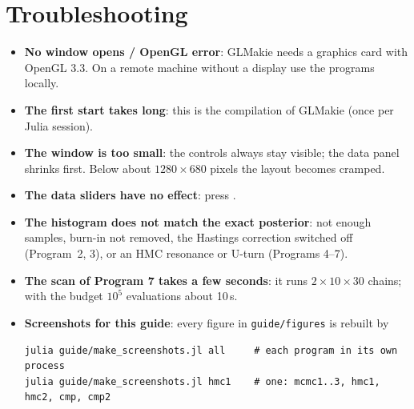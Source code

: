 \documentclass[11pt,a4paper]{article}
\newcommand{\btn}[1]{\fbox{\small\textsf{#1}}}                 %
\newcommand{\file}[1]{\texttt{#1}}
\begin{document}
\section{Troubleshooting}
\begin{itemize}
\item \textbf{No window opens / OpenGL error}: GLMakie needs a graphics card with OpenGL 3.3. On a remote
  machine without a display use the programs locally.
\item \textbf{The first start takes long}: this is the compilation of GLMakie (once per Julia session).
\item \textbf{The window is too small}: the controls always stay visible; the data panel shrinks first. Below
  about $1280\times680$ pixels the layout becomes cramped.
\item \textbf{The data sliders have no effect}: press \btn{Initialise data}.
\item \textbf{The histogram does not match the exact posterior}: not enough samples, burn-in not removed, the
  Hastings correction switched off (Program~2, 3), or an HMC resonance or U-turn (Programs 4--7).
\item \textbf{The scan of Program 7 takes a few seconds}: it runs $2\times10\times30$ chains; with the budget
  $10^5$ evaluations about 10\,s.
\item \textbf{Screenshots for this guide}: every figure in \file{guide/figures} is rebuilt by
\begin{lstlisting}
julia guide/make_screenshots.jl all     # each program in its own process
julia guide/make_screenshots.jl hmc1    # one: mcmc1..3, hmc1, hmc2, cmp, cmp2
\end{lstlisting}
\end{itemize}

\end{document}
